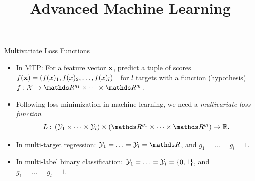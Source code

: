 \documentclass[11pt,compress,t,notes=noshow, xcolor=table]{beamer}
\title{Advanced Machine Learning}
\date{}
\begin{document}



\sloppy


\begin{frame}{Multivariate Loss Functions}
	\begin{itemize}
		\item In MTP: For a feature vector $\mathbf{x}$, predict a tuple of scores $f(\mathbf{x}) = (f(x)_1, f(x)_2, \ldots, f(x)_l)^\top$ for $l$ targets with a function (hypothesis) $f: \Xspace \rightarrow \R^{g_1} \times \cdots \times \R^{g_l} $.
        
		\item Following loss minimization in machine learning, we need a \emph{multivariate loss function} 
		$$
		L: \, (\Yspace_1 \times \cdots \times \Yspace_l) \times (\R^{g_1} \times \cdots \times \R^{g_l}) \rightarrow \mathbb{R}.
		$$ 

        \item In multi-target regression: $\Yspace_1 = \ldots = \Yspace_l = \R$, and $g_1 = \ldots = g_l = 1$.

        \item In multi-label binary classification: $\mathcal{Y}_1 =  \ldots = \mathcal{Y}_l = \{0, 1\}$, and $g_1 = \ldots = g_l = 1$. %
	\end{itemize}
	
\end{frame}
\end{document}
